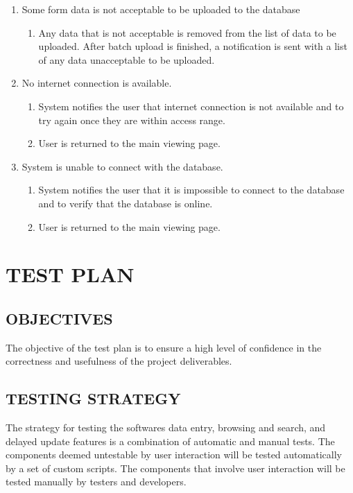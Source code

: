 \documentclass[twoside,letterpaper]{article}
\begin{document}
\begin{enumerate}
\item Some form data is not acceptable to be uploaded to the database
\begin{enumerate}
\item Any data that is not acceptable is removed from the list of data to be uploaded. After batch upload is finished, a notification is sent with a list of any data unacceptable to be uploaded.
\end{enumerate}

\item No internet connection is available.
\begin{enumerate}
\item System notifies the user that internet connection is not available and to try again once they are within access range.
\item User is returned to the main viewing page.
\end{enumerate}

\item System is unable to connect with the database.
\begin{enumerate}
\item System notifies the user that it is impossible to connect to the database and to verify that the database is online.
\item User is returned to the main viewing page.
\end{enumerate}
\end{enumerate}


\clearpage\section[TEST PLAN]{\rmfamily\bfseries\color{black}
TEST PLAN}

\subsection{OBJECTIVES}
{\rmfamily\color{black}
 The objective of the test plan is to ensure a high level of confidence in the correctness and usefulness of the project deliverables.}

\subsection{TESTING STRATEGY}
{\rmfamily\color{black}
        The strategy for testing the softwares data entry, browsing and search, and delayed update features is a combination of automatic and manual tests.  The components deemed untestable by user interaction will be tested automatically by a set of custom scripts.  The components that involve user interaction will be tested manually by testers and developers.}
        
\end{document}
